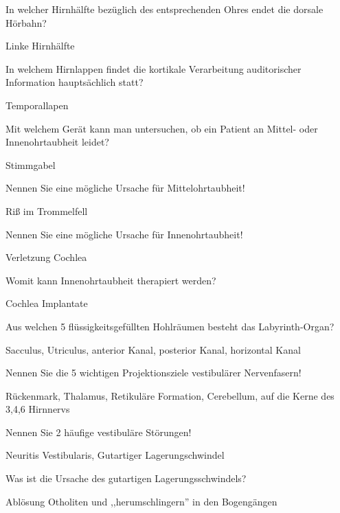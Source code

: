 \documentclass[10pt, a4paper]{exam}
\begin{document}
\begin{questions}
  \question In welcher Hirnhälfte bezüglich des entsprechenden Ohres endet die dorsale Hörbahn?
  \begin{solution}
    Linke Hirnhälfte
  \end{solution}

  \question In welchem Hirnlappen findet die kortikale Verarbeitung auditorischer Information hauptsächlich statt?
  \begin{solution}
    Temporallapen
  \end{solution}

  \question Mit welchem Gerät kann man untersuchen, ob ein Patient an Mittel- oder Innenohrtaubheit leidet?
  \begin{solution}
    Stimmgabel
  \end{solution}

  \question Nennen Sie eine mögliche Ursache für Mittelohrtaubheit!
  \begin{solution}
    Riß im Trommelfell
  \end{solution}

  \question Nennen Sie eine mögliche Ursache für Innenohrtaubheit!
  \begin{solution}
    Verletzung Cochlea
  \end{solution}

  \question Womit kann Innenohrtaubheit therapiert werden?
  \begin{solution}
    Cochlea Implantate
  \end{solution}

  \question Aus welchen 5 flüssigkeitsgefüllten Hohlräumen besteht das Labyrinth-Organ?
  \begin{solution}
    Sacculus, Utriculus, anterior Kanal, posterior Kanal, horizontal Kanal
  \end{solution}

  \question Nennen Sie die 5 wichtigen Projektionsziele vestibulärer Nervenfasern!
  \begin{solution}
    Rückenmark, Thalamus, Retikuläre Formation, Cerebellum, auf die Kerne des 3,4,6 Hirnnervs
  \end{solution}

  \question Nennen Sie 2 häufige vestibuläre Störungen!
  \begin{solution}
    Neuritis Vestibularis, Gutartiger Lagerungschwindel
  \end{solution}

  \question Was ist die Ursache des gutartigen Lagerungsschwindels?
  \begin{solution}
    Ablösung Otholiten und ,,herumschlingern'' in den Bogengängen
  \end{solution}


\end{questions}
\end{document}
